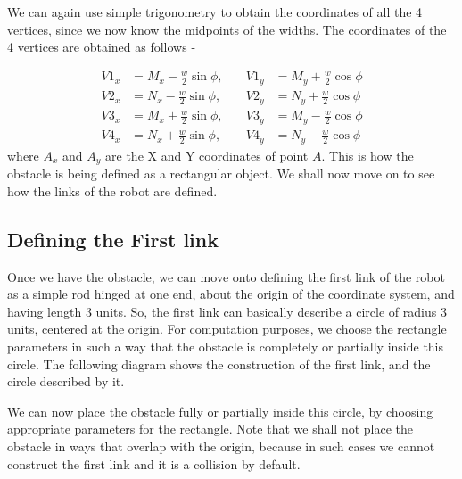 \documentclass[12pt]{article}
\begin{document}
\newline
We can again use simple trigonometry to obtain the coordinates of all the 4 vertices, since we now know the midpoints of the widths.
The coordinates of the 4 vertices are obtained as follows - 

\[
\begin{aligned}
V1_x &= M_x - \frac{w}{2} \sin\phi, \quad &V1_y &= M_y + \frac{w}{2} \cos\phi \\[6pt]
V2_x &= N_x - \frac{w}{2} \sin\phi, \quad &V2_y &= N_y + \frac{w}{2} \cos\phi \\[6pt]
V3_x &= M_x + \frac{w}{2} \sin\phi, \quad &V3_y &= M_y - \frac{w}{2} \cos\phi \\[6pt]
V4_x &= N_x + \frac{w}{2} \sin\phi, \quad &V4_y &= N_y - \frac{w}{2} \cos\phi
\end{aligned}
\]
\newline
where $A_x$ and $A_y$ are the X and Y coordinates of point $A$.
This is how the obstacle is being defined as a rectangular object. We shall now move on to see how the links of the robot are defined.
\subsection{Defining the First link}
Once we have the obstacle, we can move onto defining the first link of the robot as a simple rod hinged at one end, about the origin of the coordinate system, and having length 3 units. So, the first link can basically describe a circle of radius 3 units, centered at the origin. For computation purposes, we choose the rectangle parameters in such a way that the obstacle is completely or partially inside this circle. The following diagram shows the construction of the first link, and the circle described by it. 


\begin{center}
\end{center}
We can now place the obstacle fully or partially inside this circle, by choosing appropriate parameters for the rectangle. Note that we shall not place the obstacle in ways that overlap with the origin, because in such cases we cannot construct the first link and it is a collision by default.
\end{document}
